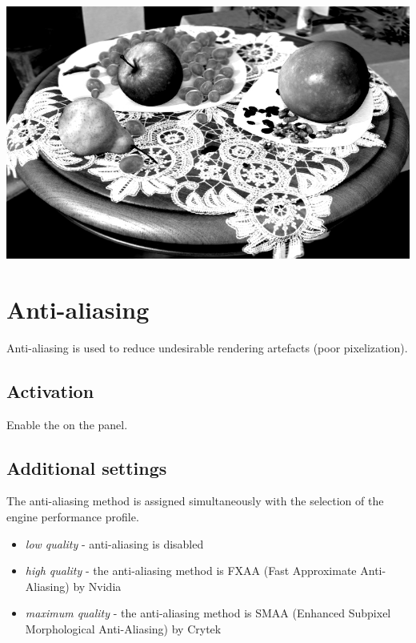 \documentclass[a4paper,12pt,oneside]{sphinxmanual}
\begin{document}
{\hfill\includegraphics[width=1.000\linewidth]{color_correction.jpg}\hfill}

\begin{DUlineblock}{0em}
\item[] 
\end{DUlineblock}


\section{Anti-aliasing}
\label{postprocessing_effects:antialiasing}\label{postprocessing_effects:index-7}\label{postprocessing_effects:id26}
Anti-aliasing is used to reduce undesirable rendering artefacts (poor pixelization).


\subsection{Activation}
\label{postprocessing_effects:id27}
Enable the  on the  panel.


\subsection{Additional settings}
\label{postprocessing_effects:id28}
The anti-aliasing method is assigned simultaneously with the selection of the engine performance profile.
\begin{itemize}
\item {} 
\emph{low quality} - anti-aliasing is disabled

\item {} 
\emph{high quality} - the anti-aliasing method is FXAA (Fast Approximate Anti-Aliasing) by Nvidia

\item {} 
\emph{maximum quality} - the anti-aliasing method is SMAA (Enhanced Subpixel Morphological Anti-Aliasing) by Crytek

\end{itemize}
\end{document}
